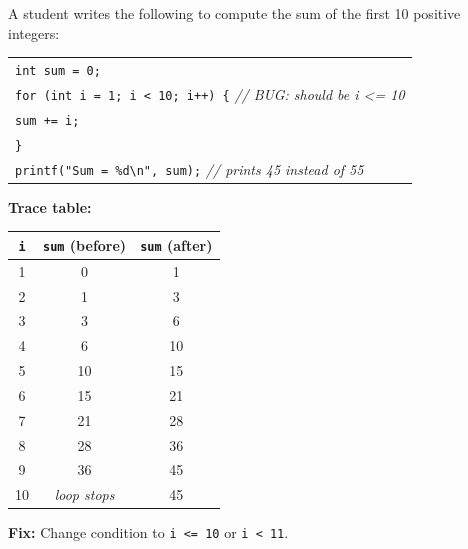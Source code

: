 \documentclass[11pt]{article}
\begin{document}
\begin{exoresolu}
A student writes the following to compute the sum of the first 10 positive integers:
\begin{center}
\begin{tabular}{l}
\texttt{int sum = 0;} \\
\texttt{for (int i = 1; i < 10; i++) \{} \quad \textit{// BUG: should be i <= 10} \\
\qquad \texttt{sum += i;} \\
\texttt{\}} \\
\texttt{printf("Sum = \%d\textbackslash n", sum);} \quad \textit{// prints 45 instead of 55}
\end{tabular}
\end{center}
\textbf{Trace table:}
\begin{center}
\begin{tabular}{|c|c|c|}\hline
\texttt{i} & \texttt{sum} (before) & \texttt{sum} (after) \\ \hline
1 & 0 & 1 \\
2 & 1 & 3 \\
3 & 3 & 6 \\
4 & 6 & 10 \\
5 & 10 & 15 \\
6 & 15 & 21 \\
7 & 21 & 28 \\
8 & 28 & 36 \\
9 & 36 & 45 \\
10 & \textit{loop stops} & 45 \\ \hline
\end{tabular}
\end{center}
\textbf{Fix:} Change condition to \texttt{i <= 10} or \texttt{i < 11}.
\end{exoresolu}
\end{document}
